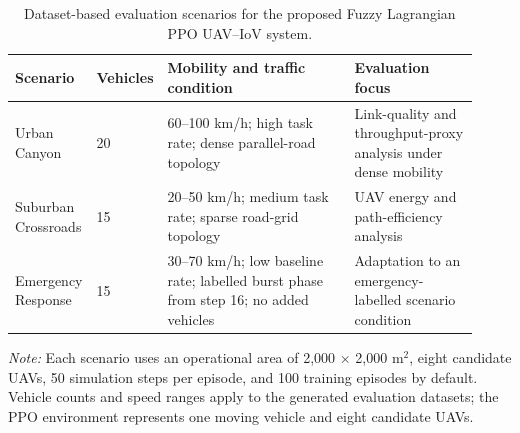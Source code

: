 \begin{table}[!t]
\caption{Dataset-based evaluation scenarios for the proposed Fuzzy Lagrangian PPO UAV--IoV system.}
\label{tab:evaluation_scenarios}
\centering
\small
\begin{tabular}{@{}p{0.16\linewidth}p{0.08\linewidth}p{0.41\linewidth}p{0.27\linewidth}@{}}
\toprule
Scenario & Vehicles & Mobility and traffic condition & Evaluation focus \\
\midrule
Urban Canyon & 20 & 60--100 km/h; high task rate; dense parallel-road topology & Link-quality and throughput-proxy analysis under dense mobility \\
Suburban Crossroads & 15 & 20--50 km/h; medium task rate; sparse road-grid topology & UAV energy and path-efficiency analysis \\
Emergency Response & 15 & 30--70 km/h; low baseline rate; labelled burst phase from step 16; no added vehicles & Adaptation to an emergency-labelled scenario condition \\
\bottomrule
\end{tabular}
\par\vspace{0.5ex}
\footnotesize\textit{Note:} Each scenario uses an operational area of 2,000 $\times$ 2,000 m$^2$, eight candidate UAVs, 50 simulation steps per episode, and 100 training episodes by default. Vehicle counts and speed ranges apply to the generated evaluation datasets; the PPO environment represents one moving vehicle and eight candidate UAVs.
\end{table}
